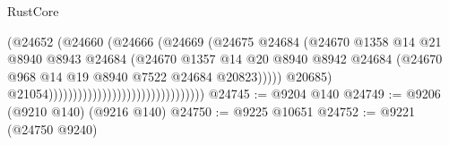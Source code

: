 \begin{lexlean}{RustCore}
\begin{coremodule}
                                                                (@24652
                                                                  (@24660
                                                                    (@24666
                                                                      (@24669
                                                                        (@24675
                                                                          @24684
                                                                          (@24670
                                                                            @1358
                                                                            @14
                                                                            @21
                                                                            @8940
                                                                            @8943
                                                                            @24684
                                                                            (@24670
                                                                              @1357
                                                                              @14
                                                                              @20
                                                                              @8940
                                                                              @8942
                                                                              @24684
                                                                              (@24670
                                                                                @968
                                                                                @14
                                                                                @19
                                                                                @8940
                                                                                @7522
                                                                                @24684
                                                                                @20823)))))
                                                                      @20685)
                                                                    @21054))))))))))))))))))))))))))))))))
@24745 := @9204 @140
@24749 := @9206 (@9210 @140) (@9216 @140)
@24750 := @9225 @10651
@24752 := @9221 (@24750 @9240)

\end{coremodule}
\end{lexlean}
